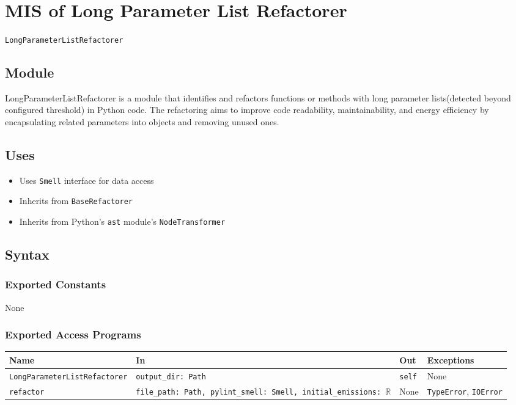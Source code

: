 \documentclass[12pt, titlepage]{article}
\begin{document}
~\newpage

\section{MIS of Long Parameter List Refactorer} \label{Module} 

\texttt{LongParameterListRefactorer}

\subsection{Module}

LongParameterListRefactorer is a module that identifies and refactors functions or methods with long parameter lists(detected beyond configured threshold) in Python code. The refactoring aims to improve code readability, maintainability, and energy efficiency by encapsulating related parameters into objects and removing unused ones.

\subsection{Uses}

\begin{itemize}
  \item Uses \texttt{Smell} interface for data access
  \item Inherits from \texttt{BaseRefactorer}
  \item Inherits from Python's \texttt{ast} module's \texttt{NodeTransformer}
\end{itemize}

\subsection{Syntax}

\subsubsection{Exported Constants}

None

\subsubsection{Exported Access Programs}

\begin{center}
\begin{tabularx}{\linewidth}{|l|>{\raggedright\arraybackslash}X|l|l|}
\hline
\textbf{Name} & \textbf{In} & \textbf{Out} & \textbf{Exceptions} \\
\hline
\texttt{LongParameterListRefactorer} & \texttt{output\_dir: Path} & \texttt{self} & None \\
\hline
\texttt{refactor} & \texttt{file\_path: Path, pylint\_smell: Smell, initial\_emissions: $\mathbb{R}$} & None & \texttt{TypeError}, \texttt{IOError} \\
\hline
\end{tabularx}
\end{center}
\end{document}
